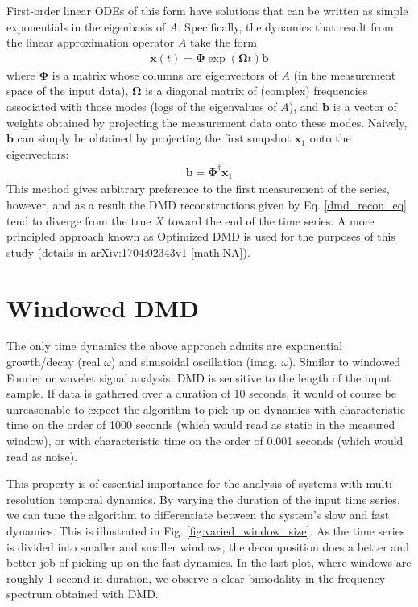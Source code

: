 \documentclass[11pt]{article} %
\begin{document}
First-order linear ODEs of this form have solutions that can be written as simple exponentials in the eigenbasis of $A$. Specifically, the dynamics that result from the linear approximation operator $A$ take the form
\begin{equation}
\begin{split}
\label{dmd_recon_eq}
\bm{x}(t) = \bm{\Phi} \exp(\bm{\Omega} t) \bm{b}
\end{split}
\end{equation}
where $\bm{\Phi}$ is a matrix whose columns are eigenvectors of $A$ (in the measurement space of the input data), $\bm{\Omega}$ is a diagonal matrix of (complex) frequencies associated with those modes (logs of the eigenvalues of $A$), and $\bm{b}$ is a vector of weights obtained by projecting the measurement data onto these modes. Naively, $\bm{b}$ can simply be obtained by projecting the first snapshot $\bm{x}_1$ onto the eigenvectors:
\begin{equation}
\begin{split}
\bm{b} = \bm{\Phi}^\dagger \bm{x}_1
\end{split}
\end{equation}
This method gives arbitrary preference to the first measurement of the series, however, and as a result the DMD reconstructions given by Eq. \ref{dmd_recon_eq} tend to diverge from the true $X$ toward the end of the time series. A more principled approach known as Optimized DMD is used for the purposes of this study (details in arXiv:1704:02343v1 [math.NA]). 

\section{Windowed DMD}
The only time dynamics the above approach admits are exponential growth/decay (real $\omega$) and sinusoidal oscillation (imag. $\omega$). Similar to windowed Fourier or wavelet signal analysis, DMD is sensitive to the length of the input sample. If data is gathered over a duration of 10 seconds, it would of course be unreasonable to expect the algorithm to pick up on dynamics with characteristic time on the order of 1000 seconds (which would read as static in the measured window), or with characteristic time on the order of 0.001 seconds (which would read as noise).

This property is of essential importance for the analysis of systems with multi-resolution temporal dynamics. By varying the duration of the input time series, we can tune the algorithm to differentiate between the system's slow and fast dynamics. This is illustrated in Fig. \ref{fig:varied_window_size}. As the time series is divided into smaller and smaller windows, the decomposition does a better and better job of picking up on the fast dynamics. In the last plot, where windows are roughly 1 second in duration, we observe a clear bimodality in the frequency spectrum obtained with DMD.
\end{document}
